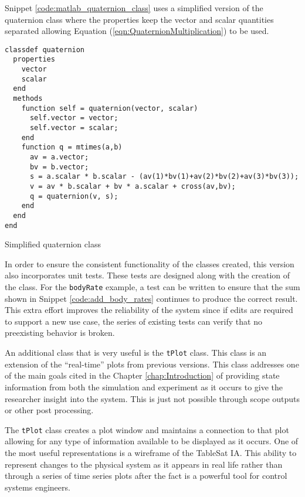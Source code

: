 Snippet \ref{code:matlab_quaternion_class} uses a simplified version of the quaternion class where the properties keep the vector and scalar quantities
separated allowing Equation (\ref{eqn:QuaternionMultiplication}) to be used.
\begin{listing}[H]
\begin{singlespace}
  \begin{verbatim}
classdef quaternion
  properties
    vector
    scalar
  end
  methods
    function self = quaternion(vector, scalar)
      self.vector = vector;
      self.vector = scalar;
    end
    function q = mtimes(a,b)
      av = a.vector;
      bv = b.vector;
      s = a.scalar * b.scalar - (av(1)*bv(1)+av(2)*bv(2)+av(3)*bv(3));
      v = av * b.scalar + bv * a.scalar + cross(av,bv);
      q = quaternion(v, s);
    end
  end
end
  \end{verbatim}
\caption{Simplified quaternion class}
\label{code:matlab_quaternion_class}
\nocite{minted}
\end{singlespace}
\end{listing}

In order to ensure the consistent functionality of the classes created, this version also incorporates unit tests.  These tests are designed along with the creation of the class.  For the \verb|bodyRate| example, a test can be written to ensure that the sum shown in Snippet \ref{code:add_body_rates} continues to produce the correct result.  This extra effort improves the reliability of the system since if edits are required to support a new use case, the series of existing tests can verify that no preexisting behavior is broken.

An additional class that is very useful is the \verb|tPlot| class.  This class is an extension of the ``real-time'' plots from previous versions.  This class addresses one of the main goals cited in the Chapter \ref{chap:Introduction} of providing state information from both the simulation and experiment as it occurs to give the researcher insight into the system.  This is just not possible through scope outputs or other post processing.

The \verb|tPlot| class creates a plot window and maintains a connection to that plot allowing for any type of information available to be displayed as it occurs.  One of the most useful representations is a wireframe of the TableSat IA.  This ability to represent changes to the physical system as it appears in real life rather than through a series of time series plots after the fact is a powerful tool for control systems engineers.

